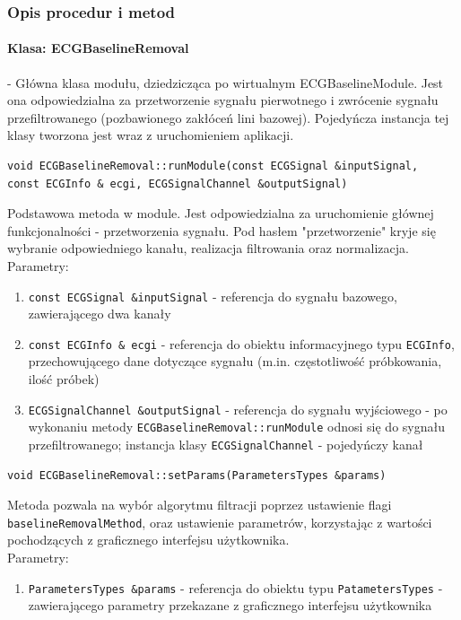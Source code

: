 \documentclass[a4paper, 11pt]{article}
\begin{document}
\subsubsection{Opis procedur i metod}
\label{sec:baseline:procs}
\paragraph{Klasa: ECGBaselineRemoval}
- Główna klasa modułu, dziedzicząca po wirtualnym ECGBaselineModule. Jest ona odpowiedzialna za przetworzenie sygnału pierwotnego i zwrócenie sygnału przefiltrowanego (pozbawionego zakłóceń lini bazowej). Pojedyńcza instancja tej klasy tworzona jest wraz z uruchomieniem aplikacji.

\begin{lstlisting}
void ECGBaselineRemoval::runModule(const ECGSignal &inputSignal, 
const ECGInfo & ecgi, ECGSignalChannel &outputSignal)
\end{lstlisting}
Podstawowa metoda w module. Jest odpowiedzialna za uruchomienie głównej funkcjonalności - przetworzenia sygnału. Pod hasłem "przetworzenie" kryje się wybranie odpowiedniego kanału, realizacja filtrowania oraz normalizacja. \\
Parametry:
\begin{enumerate}
\item \verb|const ECGSignal &inputSignal| - referencja do sygnału bazowego, zawierającego dwa kanały
\item \verb|const ECGInfo & ecgi| - referencja do obiektu informacyjnego typu \verb|ECGInfo|, przechowującego dane dotyczące sygnału (m.in. częstotliwość próbkowania, ilość próbek)
\item \verb|ECGSignalChannel &outputSignal| - referencja do sygnału wyjściowego - po wykonaniu metody \verb|ECGBaselineRemoval::runModule| odnosi się do sygnału przefiltrowanego; instancja klasy \verb|ECGSignalChannel| - pojedyńczy kanał
\end{enumerate}

\begin{lstlisting}
void ECGBaselineRemoval::setParams(ParametersTypes &params)
\end{lstlisting}
Metoda pozwala na wybór algorytmu filtracji poprzez ustawienie flagi \verb|baselineRemovalMethod|, oraz ustawienie parametrów, korzystając z wartości pochodzących z graficznego interfejsu użytkownika. \\
Parametry:
\begin{enumerate}
\item \verb|ParametersTypes &params| - referencja do obiektu typu \verb|PatametersTypes| - zawierającego parametry przekazane z graficznego interfejsu użytkownika
\end{enumerate}
\end{document}

